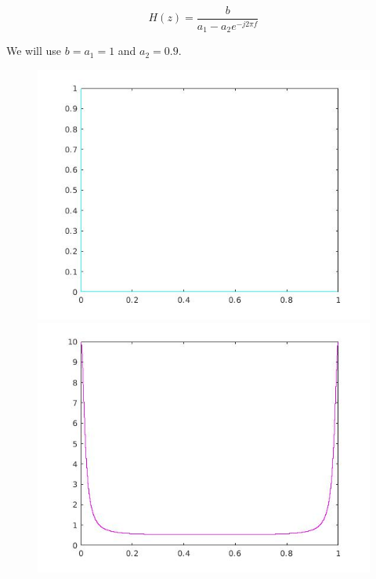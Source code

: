 \documentclass[a4paper,11pt]{article}
\begin{document}
\begin{equation}H(z) = \frac{b}{a_1-a_2e^{-j2 \pi f}}\end{equation}

We will use $b = a_1 = 1$ and $a_2 = 0.9$.

\begin{figure}[!hp]
\centering
\begin{minipage}{.5\textwidth}
  \centering
  \includegraphics[width=1\linewidth]{images/lab1_25.jpg}
\end{minipage}%
\begin{minipage}{.5\textwidth}
  \centering
  \includegraphics[width=1\linewidth]{images/lab1_23.jpg}
\end{minipage}
\end{figure}
\end{document}
